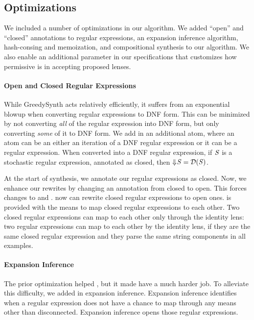 \documentclass[acmsmall,screen,anonymous]{acmart}
\begin{document}
\subsection{Optimizations}

We included a number of optimizations in our algorithm. We added ``open'' and
``closed'' annotations to regular expressions, an expansion inference algorithm,
hash-consing and memoization, and compositional synthesis to our algorithm. We
also enable an additional parameter in our specifications that customizes how
permissive \RXSearch{} is in accepting proposed lenses.

\paragraph*{Open and Closed Regular Expressions} While GreedySynth acts
relatively efficiently, it suffers from an exponential blowup when converting
regular expressions to DNF form. This can be minimized by not converting
\emph{all} of the regular expression into DNF form, but only converting
\emph{some} of it to DNF form. We add in an additional atom, where an atom can
be an either an iteration of a DNF regular expression or it can be a regular
expression. When converted into a DNF regular expression, if $\mathit{S}$ is a
stochastic regular expression, annotated as closed, then $\Downarrow\mkern-4mu \mathit{S}
= \mathcal{D}(\mathit{S})$.

At the start of synthesis, we annotate our regular expressions as closed. Now,
we enhance our rewrites by changing an annotation from closed to open. This
forces changes to \RXSearch and \GreedySynth. \RXSearch now can rewrite closed
regular expressions to open ones. \GreedySynth is provided with the means to map
closed regular expressions to each other. Two closed regular expressions can map
to each other only through the identity lens: two regular expressions can map to
each other by the identity lens, if they are the same closed regular expression
and they parse the same string components in all examples.

\paragraph*{Expansion Inference} The prior optimization helped \GreedySynth, but
it made \RXSearch have a much harder job.  To alleviate this difficulty, we
added in expansion inference.  Expansion inference identifies when a regular
expression does not have a chance to map through any means other than
disconnected.  Expansion inference opens those regular expressions.
\end{document}
